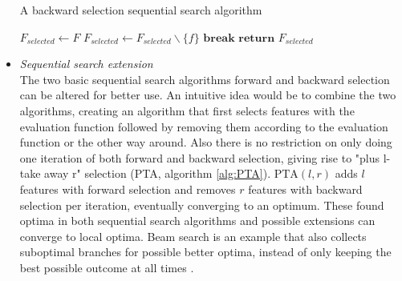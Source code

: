 \documentclass[10pt,a4paper]{report}
\begin{document}
\begin{itemize}
		\begin{algorithm}[H]
			\caption{A backward selection sequential search algorithm \cite{Reunanen2006}}\label{alg:BackwardSelection}
			\begin{algorithmic}[1]
				\State $F_{\textit{selected}} \gets F$				
						
				 
				\State $F_{\textit{selected}} \gets F_{\textit{selected}} \backslash \{f\}$ 
				\EndIf
				 
				\State $\textbf{break}$
				\EndIf
				\EndFor
				\State $\textbf{return } F_{\textit{selected}}$
				\EndProcedure
			\end{algorithmic}
		\end{algorithm}
		
		\item \textit{Sequential search extension} \\
		The two basic sequential search algorithms forward and backward selection can be altered for better use. An intuitive idea would be to combine the two algorithms, creating an algorithm that first selects features with the evaluation function followed by removing them according to the evaluation function or the other way around. Also there is no restriction on only doing one iteration of both forward and backward selection, giving rise to "plus l-take away r" selection (PTA, algorithm \ref{alg:PTA}). $\text{PTA}(l, r)$ adds $l$ features with forward selection and removes $r$ features with backward selection per iteration, eventually converging to an optimum. 
		These found optima in both sequential search algorithms and possible extensions can converge to local optima. Beam search is an example that also collects suboptimal branches for possible better optima, instead of only keeping the best possible outcome at all times \cite{Reunanen2006}.
		

\end{itemize}
\end{document}
